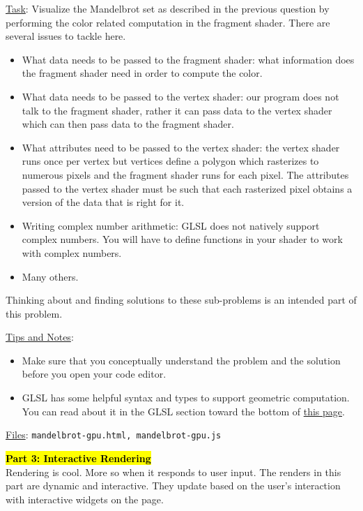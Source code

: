 \documentclass[addpoints]{exam}
\begin{document}
\begin{questions}
  \underline{Task}: Visualize the Mandelbrot set as described in the previous question by performing the color related computation in the fragment shader. There are several issues to tackle here.
  \begin{itemize}
  \item What data needs to be passed to the fragment shader: what information does the fragment shader need in order to compute the color.
  \item What data needs to be passed to the vertex shader: our program does not talk to the fragment shader, rather it can pass data to the vertex shader which can then pass data to the fragment shader.
  \item What attributes need to be passed to the vertex shader: the vertex shader runs once per vertex but vertices define a polygon which rasterizes to numerous pixels and the fragment shader runs for each pixel. The attributes passed to the vertex shader must be such that each rasterized pixel obtains a version of the data that is right for it.
  \item Writing complex number arithmetic: GLSL does not natively support complex numbers. You will have to define functions in your shader to work with complex numbers.
  \item Many others.
  \end{itemize}
  Thinking about and finding solutions to these sub-problems is an intended part of this problem.

  \underline{Tips and Notes}:
  \begin{itemize}
  \item Make sure that you conceptually understand the problem and the solution before you open your code editor.
  \item GLSL has some helpful syntax and types to support geometric computation. You can read about it in the GLSL section toward the bottom of \href{https://webgl2fundamentals.org/webgl/lessons/webgl-shaders-and-glsl.html}{this page}.
  \end{itemize}
  
  \noindent\underline{Files}: \texttt{mandelbrot-gpu.html, mandelbrot-gpu.js}
  
  \begin{EnvFullwidth}
    {\Large\bf \hl{Part 3: Interactive Rendering}}\\
    Rendering is cool. More so when it responds to user input. The renders in this part are dynamic and interactive. They update based on the user's interaction with interactive widgets on the page.
  \end{EnvFullwidth}
  

\end{questions}
\end{document}

